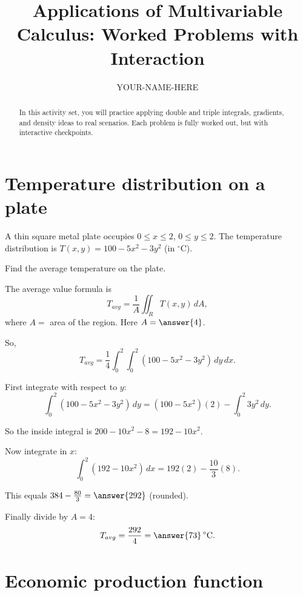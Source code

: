 \documentclass{ximera}
\title{Applications of Multivariable Calculus: Worked Problems with Interaction}
\author{YOUR-NAME-HERE}
\begin{document}
\begin{abstract}
In this activity set, you will practice applying double and triple integrals, gradients, and density ideas to real scenarios. Each problem is fully worked out, but with interactive checkpoints.
\end{abstract}
\maketitle

\section{Temperature distribution on a plate}

A thin square metal plate occupies $0\leq x\leq 2$, $0\leq y\leq 2$. 
The temperature distribution is $T(x,y)=100-5x^2-3y^2$ (in ${}^\circ$C).

\begin{problem}
Find the average temperature on the plate.

\begin{solution}
The average value formula is
\[
T_{avg} = \frac{1}{A}\iint_{R} T(x,y)\,dA,
\]
where $A=$ area of the region. Here $A=\answer{4}$.

So,
\[
T_{avg}=\frac{1}{4}\int_0^2\int_0^2 (100-5x^2-3y^2)\,dy\,dx.
\]

First integrate with respect to $y$:
\[
\int_0^2 (100-5x^2-3y^2)\,dy 
= (100-5x^2)(2) - \int_0^2 3y^2\,dy.
\]

\begin{multipleChoice}
\end{multipleChoice}

So the inside integral is $200-10x^2-8=192-10x^2$.

Now integrate in $x$:
\[
\int_0^2 (192-10x^2)\,dx = 192(2) - \frac{10}{3}(8).
\]

This equals $384 - \frac{80}{3} = \answer{292}$ (rounded).

Finally divide by $A=4$:
\[
T_{avg} = \frac{292}{4} = \answer{73}\,^\circ\text{C}.
\]
\end{solution}
\end{problem}

\section{Economic production function}
\end{document}
